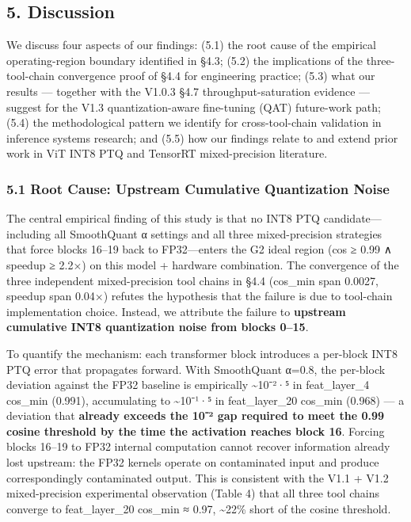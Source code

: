 \documentclass[
]{article}
\begin{document}
\subsection{5. Discussion}\label{5-discussion}

We discuss four aspects of our findings: (5.1) the root cause of the
empirical operating-region boundary identified in §4.3; (5.2) the
implications of the three-tool-chain convergence proof of §4.4 for
engineering practice; (5.3) what our results --- together with the
V1.0.3 §4.7 throughput-saturation evidence --- suggest for the V1.3
quantization-aware fine-tuning (QAT) future-work path; (5.4) the
methodological pattern we identify for cross-tool-chain validation in
inference systems research; and (5.5) how our findings relate to and
extend prior work in ViT INT8 PTQ and TensorRT mixed-precision
literature.

\subsubsection{5.1 Root Cause: Upstream Cumulative Quantization
Noise}\label{51-root-cause-upstream-cumulative-quantization-noise}

The central empirical finding of this study is that no INT8 PTQ
candidate---including all SmoothQuant α settings and all three
mixed-precision strategies that force blocks 16--19 back to
FP32---enters the G2 ideal region (cos ≥ 0.99 ∧ speedup ≥ 2.2×) on this
model + hardware combination. The convergence of the three independent
mixed-precision tool chains in §4.4 (cos\_min span 0.0027, speedup span
0.04×) refutes the hypothesis that the failure is due to tool-chain
implementation choice. Instead, we attribute the failure to
\textbf{upstream cumulative INT8 quantization noise from blocks 0--15}.

To quantify the mechanism: each transformer block introduces a per-block
INT8 PTQ error that propagates forward. With SmoothQuant α=0.8, the
per-block deviation against the FP32 baseline is empirically
\textasciitilde10⁻²·⁵ in feat\_layer\_4 cos\_min (0.991), accumulating
to \textasciitilde10⁻¹·⁵ in feat\_layer\_20 cos\_min (0.968) --- a
deviation that \textbf{already exceeds the 10⁻² gap required to meet the
0.99 cosine threshold by the time the activation reaches block 16}.
Forcing blocks 16--19 to FP32 internal computation cannot recover
information already lost upstream: the FP32 kernels operate on
contaminated input and produce correspondingly contaminated output. This
is consistent with the V1.1 + V1.2 mixed-precision experimental
observation (Table 4) that all three tool chains converge to
feat\_layer\_20 cos\_min ≈ 0.97, \textasciitilde22\% short of the cosine
threshold.
\end{document}
